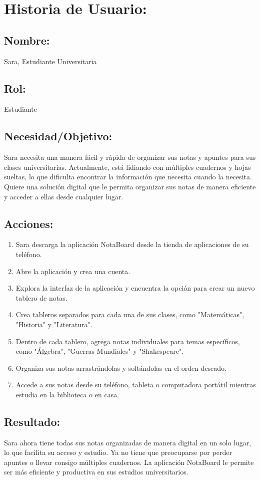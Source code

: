 \section{Historia de Usuario:}

\subsection*{Nombre:} 
Sara, Estudiante Universitaria

\subsection*{Rol:} 
Estudiante

\subsection*{Necesidad/Objetivo:}
Sara necesita una manera fácil y rápida de organizar sus notas y apuntes para sus clases universitarias. Actualmente, está lidiando con múltiples cuadernos y hojas sueltas, lo que dificulta encontrar la información que necesita cuando la necesita. Quiere una solución digital que le permita organizar sus notas de manera eficiente y acceder a ellas desde cualquier lugar.

\subsection*{Acciones:}
\begin{enumerate}[label=\arabic*.]
    \item Sara descarga la aplicación NotaBoard desde la tienda de aplicaciones de su teléfono.
    \item Abre la aplicación y crea una cuenta.
    \item Explora la interfaz de la aplicación y encuentra la opción para crear un nuevo tablero de notas.
    \item Crea tableros separados para cada una de sus clases, como "Matemáticas", "Historia" y "Literatura".
    \item Dentro de cada tablero, agrega notas individuales para temas específicos, como "Álgebra", "Guerras Mundiales" y "Shakespeare".
    \item Organiza sus notas arrastrándolas y soltándolas en el orden deseado.
    \item Accede a sus notas desde su teléfono, tableta o computadora portátil mientras estudia en la biblioteca o en casa.
\end{enumerate}

\subsection*{Resultado:}
Sara ahora tiene todas sus notas organizadas de manera digital en un solo lugar, lo que facilita su acceso y estudio. Ya no tiene que preocuparse por perder apuntes o llevar consigo múltiples cuadernos. La aplicación NotaBoard le permite ser más eficiente y productiva en sus estudios universitarios.

